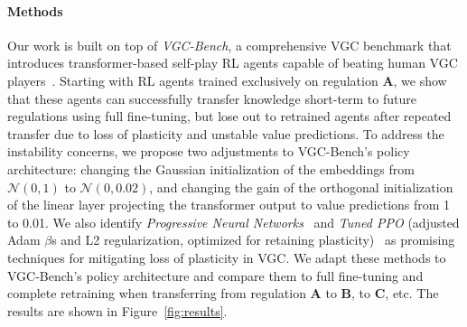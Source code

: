 \documentclass{llncs}
\begin{document}
\paragraph{Methods}
Our work is built on top of \textit{VGC-Bench}, a comprehensive VGC benchmark that introduces transformer-based self-play RL agents capable of beating human VGC players~\cite{angliss2025vgc}.
Starting with RL agents trained exclusively on regulation \textbf{A}, we show that these agents can successfully transfer knowledge short-term to future regulations using full fine-tuning, but lose out to retrained agents after repeated transfer due to loss of plasticity and unstable value predictions.
To address the instability concerns, we propose two adjustments to VGC-Bench's policy architecture: changing the Gaussian initialization of the embeddings from $\mathcal{N}(0,1)$ to $\mathcal{N}(0,0.02)$, and changing the gain of the orthogonal initialization of the linear layer projecting the transformer output to value predictions from 1 to 0.01.
We also identify \textit{Progressive Neural Networks}~\cite{rusu2016pnn} and \textit{Tuned PPO} (adjusted Adam $\beta$s and L2 regularization, optimized for retaining plasticity)~\cite{dohare2024plasticity,lyle2023plasticity} as promising techniques for mitigating loss of plasticity in VGC.
We adapt these methods to VGC-Bench's policy architecture and compare them to full fine-tuning and complete retraining when transferring from regulation \textbf{A} to \textbf{B}, to \textbf{C}, etc.
The results are shown in Figure~\ref{fig:results}.
\end{document}

